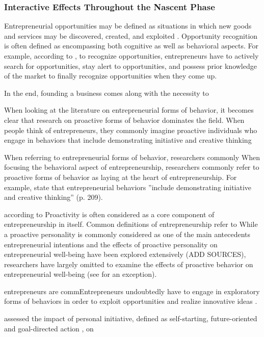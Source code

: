 \documentclass[a4paper,man,natbib]{apa6}
\begin{document}
\subsubsection{Interactive Effects Throughout the Nascent Phase}
Entrepreneurial opportunities may be defined as situations in which new goods and services may be discovered, created, and exploited \citep{Venkataraman.2019}. Opportunity recognition is often defined as encompassing both cognitive as well as behavioral aspects. For example, according to \cite{Baron2006}, to recognize opportunities, entrepreneurs have to actively search for opportunities, stay alert to opportunities, and possess prior knowledge of the market to finally recognize opportunities when they come up. 

In the end, founding a business comes along with the necessity to 

When looking at the literature on entrepreneurial forms of behavior, it becomes clear that research on proactive forms of behavior dominates the field. When people think of entrepreneurs, they commonly imagine proactive individuals who engage in behaviors that include demonstrating initiative and creative thinking

 When referring to entrepreneurial forms of behavior, researchers commonly When focusing the behavioral aspect of entrepreneurship, researchers commonly refer to proactive forms of behavior as laying at the heart of entrepreneurship. For example, \cite{Hisrich1990} state that entrepreneurial behaviors ''include demonstrating initiative and creative thinking'' (p. 209). 

according to Proactivity is often considered as a core component of entrepreneurship in itself. Common definitions of entrepreneurship refer to 
While a proactive personality is commonly considered as one of the main antecedents entrepreneurial intentions \cite[e.g.][]{Crant1996} and the effects of proactive personality on entrepreneurial well-being have been explored extensively (ADD SOURCES), researchers have largely omitted to examine the effects of proactive behavior on entrepreneurial well-being (see \cite{Hahn2012} for an exception). 

entrepreneurs are commEntrepreneurs undoubtedly have to engage in exploratory forms of behaviors in order to exploit opportunities and realize innovative ideas \cite[e.g.,][]{Dess1999}. 

\cite{Hahn2012} assessed the impact of personal initiative, defined as self-starting, future-oriented and goal-directed action \citep{Bledow2009}, on 


\end{document}
